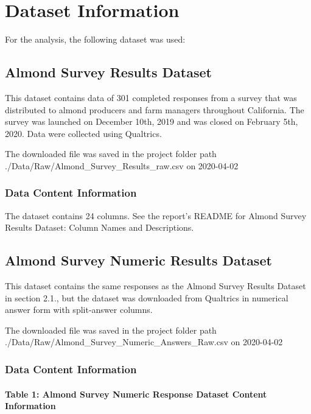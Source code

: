 \documentclass[12pt,]{article}
\let\oldparagraph\paragraph
\renewcommand{\paragraph}[1]{\oldparagraph{#1}\mbox{}}
\begin{document}
\newpage

\section{Dataset Information}\label{dataset-information}

For the analysis, the following dataset was used:

\subsection{Almond Survey Results
Dataset}\label{almond-survey-results-dataset}

This dataset contains data of 301 completed responses from a survey that
was distributed to almond producers and farm managers throughout
California. The survey was launched on December 10th, 2019 and was
closed on February 5th, 2020. Data were collected using Qualtrics.

The downloaded file was saved in the project folder path
./Data/Raw/Almond\_Survey\_Results\_raw.csv on 2020-04-02

\subsubsection{Data Content Information}\label{data-content-information}

The dataset contains 24 columns. See the report's README for Almond
Survey Results Dataset: Column Names and Descriptions.

\subsection{Almond Survey Numeric Results
Dataset}\label{almond-survey-numeric-results-dataset}

This dataset contains the same responses as the Almond Survey Results
Dataset in section 2.1., but the dataset was downloaded from Qualtrics
in numerical answer form with split-answer columns.

The downloaded file was saved in the project folder path
./Data/Raw/Almond\_Survey\_Numeric\_Answers\_Raw.csv on 2020-04-02

\subsubsection{Data Content
Information}\label{data-content-information-1}

\paragraph{Table 1: Almond Survey Numeric Response Dataset Content
Information}\label{table-1-almond-survey-numeric-response-dataset-content-information}
\end{document}
